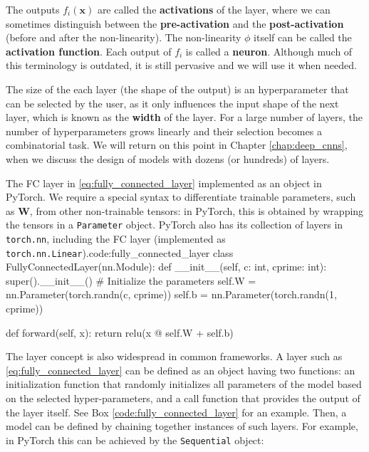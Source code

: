 The outputs $f_i(\mathbf{x})$ are called the \textbf{activations} of the layer, where we can sometimes distinguish between the \textbf{pre-activation} and the \textbf{post-activation} (before and after the non-linearity). The non-linearity $\phi$ itself can be called the \textbf{activation function}. Each output of $f_i$ is called a \textbf{neuron}. Although much of this terminology is outdated, it is still pervasive and we will use it when needed.

The size of the each layer (the shape of the output) is an hyperparameter that can be selected by the user, as it only influences the input shape of the next layer, which is known as the \textbf{width} of the layer. For a large number of  layers, the number of hyperparameters grows linearly and their selection becomes a combinatorial task. We will return on this point in Chapter \ref{chap:deep_cnns}, when we discuss the design of models with dozens (or hundreds) of layers.

\begin{mypy}{The FC layer in \eqref{eq:fully_connected_layer} implemented as an object in PyTorch. We require a special syntax to differentiate trainable parameters, such as $\mathbf{W}$, from other non-trainable tensors: in PyTorch, this is obtained by wrapping the tensors in a {\footnotesize\texttt{Parameter}} object. PyTorch also has its collection of layers in {\footnotesize\texttt{torch.nn}}, including the FC layer (implemented as {\footnotesize\texttt{torch.nn.Linear}}).}{code:fully_connected_layer}
class FullyConnectedLayer(nn.Module):
  def __init__(self, c: int, cprime: int):
    super().__init__()
    # Initialize the parameters
    self.W = nn.Parameter(torch.randn(c, cprime))
    self.b = nn.Parameter(torch.randn(1, cprime))

  def forward(self, x):
    return relu(x @ self.W + self.b)
\end{mypy}

The layer concept is also widespread in common frameworks. A layer such as \eqref{eq:fully_connected_layer} can be defined as an object having two functions: an initialization function that randomly initializes all parameters of the model based on the selected hyper-parameters, and a call function that provides the output of the layer itself. See Box \ref{code:fully_connected_layer} for an example. Then, a model can be defined by chaining together instances of such  layers. For example, in PyTorch this can be achieved by the {\footnotesize\texttt{Sequential}} object:

